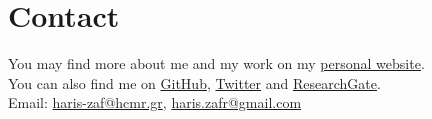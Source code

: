 \section*{Contact}

You may find more about me and my work on my \href{https://hariszaf.github.io/}{personal website}.\\
You can also find me on 
\href{https://github.com/hariszaf}{GitHub},
\href{https://twitter.com/haris_zaf}{Twitter} and
\href{https://www.researchgate.net/profile/Haris-Zafeiropoulos}{ResearchGate}. \\
Email: 
\href{mailto:haris-zaf@hcmr.gr}{haris-zaf@hcmr.gr}, 
\href{mailto:haris.zafr@gmail.com}{haris.zafr@gmail.com}

